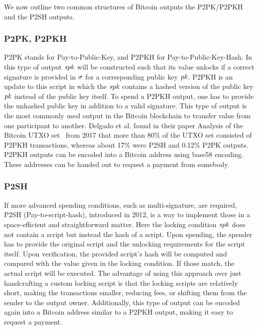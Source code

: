 We now outline two common structures of Bitcoin outputs the P2PK/P2PKH and the P2SH outputs.

\subsubsection{P2PK, P2PKH\label{sec:pre:bitcoin:p2pk}}

P2PK stands for Pay-to-Public-Key, and P2PKH for Pay-to-Public-Key-Hash.
In this type of output $\mathit{spk}$ will be constructed such that its value unlocks if a correct signature is provided in $\mathit{\sigma}$ for a corresponding public key $\mathit{pk}$.
P2PKH is an update to this script in which the $\mathit{spk}$ contains a hashed version of the public key $\mathit{pk}$ instead of the public key itself.
To spend a P2PKH output, one has to provide the unhashed public key in addition to a valid signature.
This type of output is the most commonly used output in the Bitcoin blockchain to transfer value from one participant to another.
Delgado et al. found in their paper Analysis of the Bitcoin UTXO set~\cite{delgado2018analysis} from 2017 that more than 80\% of the UTXO set consisted of P2PKH transactions, whereas about 17\% were P2SH and 0.12\% P2PK outputs.
P2PKH outputs can be encoded into a Bitcoin address using base58 encoding.
These addresses can be handed out to request a payment from somebody.

\subsubsection{P2SH} \label{sec:pre:bitcoin:p2sh}

If more advanced spending conditions, such as multi-signature, are required, P2SH (Pay-to-script-hash), introduced in 2012, is a way to implement those in a space-efficient and straightforward matter.
Here the locking condition $\mathit{spk}$ does not contain a script but instead the hash of a script.
Upon spending, the spender has to provide the original script and the unlocking requirements for the script itself.
Upon verification, the provided script's hash will be computed and compared with the value given in the locking condition.
If those match, the actual script will be executed.
The advantage of using this approach over just handcrafting a custom locking script is that the locking scripts are relatively short, making the transactions smaller, reducing fees, or shifting them from the sender to the output owner.
Additionally, this type of output can be encoded again into a Bitcoin address similar to a P2PKH output, making it easy to request a payment.